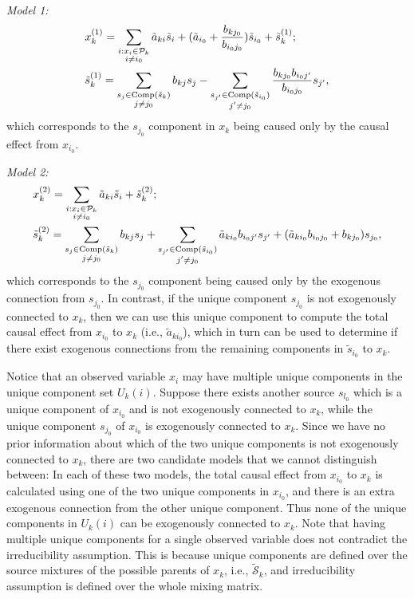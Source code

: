 \documentclass[12pt]{article}
\newcommand{\setS}{\mathcal{S}}
\begin{document}
{\it{Model 1:}}
\begin{align}
\nonumber&x_k^{(1)} = 
\sum_{\substack{i:x_i\in \mathcal{P}_k\\ i\neq i_0}} \tilde{a}_{k i} \tilde{s}_{i} + (\tilde{a}_{i_0}+ \frac{b_{kj_0}}{b_{i_0j_0}})\tilde{s}_{i_0} + \tilde{s}^{(1)}_k;\\
&\tilde{s}^{(1)}_k = \sum_{\substack{s_j\in {\rm{Comp}}(\tilde{s}_k)\\ j\neq j_0}} b_{kj} s_j - \sum_{\substack{s_{j'}\in {\rm{Comp}}(\tilde{s}_{i_0})\\ j'\neq j_0}} \frac{b_{kj_0}b_{i_0j'}}{b_{i_0j_0}} s_{j'},
\label{eq:case14}
\end{align}
which corresponds to the $s_{j_0}$ component in $x_k$ being caused only by the causal effect from $x_{i_0}$.

{\it{Model 2:}}
\begin{align}
\nonumber &x_k^{(2)} = \sum_{\substack{i:x_i\in \mathcal{P}_k\\ i\neq i_0}} \tilde{a}_{k i} \tilde{s}_{i} + \tilde{s}^{(2)}_k;\\
&\tilde{s}^{(2)}_k = \sum_{\substack{s_j\in {\rm{Comp}}(\tilde{s}_k)\\ j\neq j_0}} b_{kj} s_j + \sum_{\substack{s_{j'}\in {\rm{Comp}}(\tilde{s}_{i_0})\\ j'\neq j_0}}\tilde{a}_{k i_0} b_{i_0j'} s_{j'} + (\tilde{a}_{k i_0} b_{i_0 j_0} +  b_{kj_0} ) s_{j_0},
\label{eq:case15}
\end{align}
which corresponds to the $s_{j_0}$ component being caused only by the exogenous connection from $s_{j_0}$. 
In contrast, if the unique component $s_{j_0}$ is not exogenously connected to $x_k$, then we can use this unique component to compute the total causal effect from $x_{i_0}$ to $x_k$ (i.e., $\tilde{a}_{k i_0}$), which in turn can be used to determine if there exist exogenous connections from the remaining components in $\tilde{s}_{i_0}$ to $x_k$.

Notice that an observed variable $x_i$ may have multiple unique components in the unique component set $U_{k}(i)$. Suppose there exists another source $s_{l_0}$ which is a unique component of $x_{i_0}$ and is not exogenously connected to $x_k$, while the unique component $s_{j_0}$ of $x_{i_0}$ is exogenously connected to $x_k$. Since we have no prior information about which of the two unique components is not exogenously connected to $x_k$, there are two candidate models that we cannot distinguish between: In each of these two models, the total causal effect from $x_{i_0}$ to $x_k$ is calculated using one of the two unique components in $x_{i_0}$, and there is an extra exogenous connection from the other unique component. Thus none of the unique components in $U_k(i)$ can be exogenously connected to $x_k$.
Note that having multiple unique components for a single observed variable does not contradict the irreducibility assumption. This is because unique components are defined over the source mixtures of the possible parents of $x_k$, i.e., $\tilde{\setS}_k$, and irreducibility assumption is defined over the whole mixing matrix. 
\end{document}
